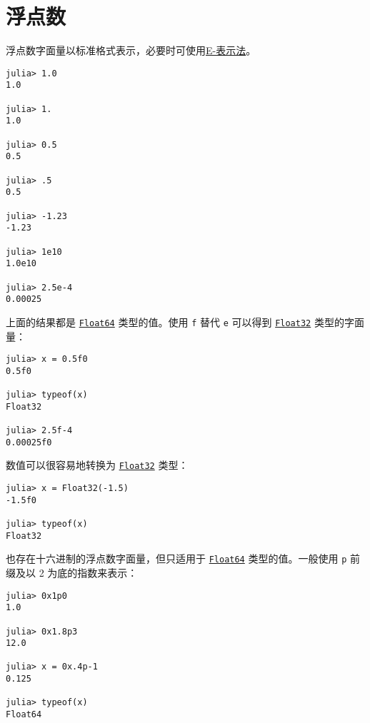 \hypertarget{7313324545649063110}{}


\section{浮点数}



浮点数字面量以标准格式表示，必要时可使用\href{https://en.wikipedia.org/wiki/Scientific\_notation\#E\_notation}{E-表示法}。




\begin{verbatim}
julia> 1.0
1.0

julia> 1.
1.0

julia> 0.5
0.5

julia> .5
0.5

julia> -1.23
-1.23

julia> 1e10
1.0e10

julia> 2.5e-4
0.00025
\end{verbatim}



上面的结果都是 \hyperlink{5027751419500983000}{\texttt{Float64}} 类型的值。使用 \texttt{f} 替代 \texttt{e} 可以得到 \hyperlink{8101639384272933082}{\texttt{Float32}} 类型的字面量：




\begin{verbatim}
julia> x = 0.5f0
0.5f0

julia> typeof(x)
Float32

julia> 2.5f-4
0.00025f0
\end{verbatim}



数值可以很容易地转换为 \hyperlink{8101639384272933082}{\texttt{Float32}} 类型：




\begin{verbatim}
julia> x = Float32(-1.5)
-1.5f0

julia> typeof(x)
Float32
\end{verbatim}



也存在十六进制的浮点数字面量，但只适用于 \hyperlink{5027751419500983000}{\texttt{Float64}} 类型的值。一般使用 \texttt{p} 前缀及以 2 为底的指数来表示：




\begin{verbatim}
julia> 0x1p0
1.0

julia> 0x1.8p3
12.0

julia> x = 0x.4p-1
0.125

julia> typeof(x)
Float64
\end{verbatim}




